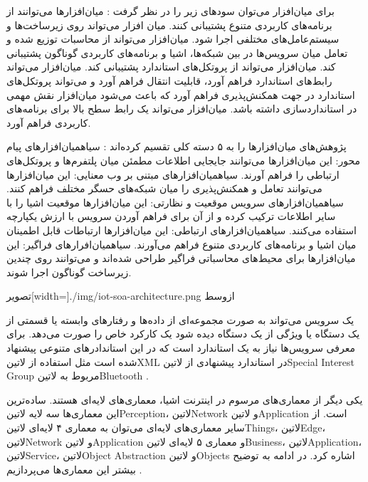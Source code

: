 برای میان‌افزار می‌توان سودهای زیر را در نظر گرفت
:
 میان‌افزارها می‌توانند از برنامه‌های کاربردی متنوع پشتیبانی کنند.
 میان افزار می‌تواند روی زیرساخت‌ها و سیستم‌عامل‌های مختلفی اجرا شود.
 میان‌افزار می‌تواند از محاسبات توزیع شده و تعامل میان سرویس‌ها در بین شبکه‌ها، اشیا و برنامه‌های کاربردی گوناگون پشتیبانی کند.
 میان‌افزار می‌تواند از پروتکل‌های استاندارد پشتیبانی کند.
 میان‌افزار می‌تواند رابط‌های استاندارد فراهم آورد، قابلیت انتقال فراهم آورد و می‌تواند پروتکل‌های استاندارد در جهت همکنش‌پذیری فراهم آورد که باعث می‌شود میان‌افزار نقش مهمی در استانداردسازی داشته باشد.
 میان‌افزار می‌تواند یک رابط سطح بالا برای برنامه‌های کاربردی فراهم آورد.

پژوهش‌های میان‌افزارها را به ۵ دسته کلی تقسیم کرده‌اند
:
 ‌سیاه{میان‌افزارهای پیام محور}: این میان‌افزارها می‌توانند جایجایی اطلاعات مطمئن میان پلتفرم‌ها و پروتکل‌های ارتباطی را فراهم آورند.
 ‌سیاه{میان‌افزارهای مبتنی بر وب معنایی}: این میان‌افزارها می‌توانند تعامل و همکنش‌پذیری را میان شبکه‌های حسگر مختلف فراهم کنند.
 ‌سیاه{میان‌افزارهای سرویس موقعیت و نظارتی}: این میان‌افزارها موقعیت اشیا را با سایر اطلاعات ترکیب کرده و از آن برای فراهم آوردن سرویس با ارزش یکپارچه استفاده می‌کنند.
 ‌سیاه{میان‌افزارهای ارتباطی}: این میان‌افزارها ارتباطات قابل اطمینان میان اشیا و برنامه‌های کاربردی متنوع فراهم می‌آورند.
 ‌سیاه{میان‌افرارهای فراگیر}: این میان‌افزارها برای محیط‌های محاسباتی فراگیر طراحی شده‌اند و می‌توانند روی چندین زیرساخت گوناگون اجرا شوند.

‌تصویر[width=\textwidth]{./img/iot-soa-architecture.png}
‌ازوسط

یک سرویس می‌تواند به صورت مجموعه‌ای از داده‌ها و رفتارهای وابسته یا قسمتی از یک دستگاه یا ویژگی از یک دستگاه دیده شود یک کارکرد خاص را صورت می‌دهد.
برای معرفی سرویس‌ها نیاز به یک استاندارد است که در این استاندادرهای متنوعی پیشنهاد شده است مثل استفاده از ‌لاتین{XML} در استاندارد پیشنهادی از ‌لاتین{Special Interest Group} مربوط به ‌لاتین{Bluetooth}
.

یکی دیگر از معماری‌های مرسوم در اینترنت اشیا، معماری‌های لایه‌ای هستند. ساده‌ترین این معماری‌ها سه لایه ‌لاتین{Perception}، ‌لاتین{Network} و ‌لاتین{Application}
است. از سایر معماری‌های لایه‌ای می‌توان به معماری ۴ لایه‌ای ‌لاتین{Things}، ‌لاتین{Edge}، ‌لاتین{Network} و ‌لاتین{Application} و معماری ۵ لایه‌ای
‌لاتین{Business}، ‌لاتین{Application}، ‌لاتین{Service}، ‌لاتین{Object Abstraction} و ‌لاتین{Objects} اشاره کرد. در ادامه به توضیح بیشتر این معماری‌ها می‌پردازیم
.

